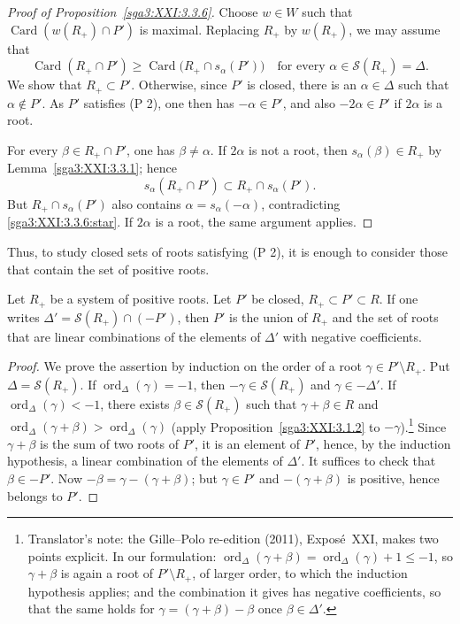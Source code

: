 \begin{proof}[Proof of Proposition~\ref{sga3:XXI:3.3.6}]
Choose \(w\in W\) such that
\(\operatorname{Card}(w(R_+)\cap P')\) is maximal. Replacing \(R_+\)
by \(w(R_+)\), we may assume that
\begin{equation}
 \operatorname{Card}(R_+\cap P')
 \geq
 \operatorname{Card}\bigl(R_+\cap s_\alpha(P')\bigr)
 \quad\text{for every }\alpha\in\mathscr{S}(R_+)=\Delta.
 \tag{\(\ast\)}\label{sga3:XXI:3.3.6:star}
\end{equation}
We show that \(R_+\subset P'\). Otherwise, since \(P'\) is closed,
there is an \(\alpha\in\Delta\) such that \(\alpha\notin P'\). As
\(P'\) satisfies (P 2), one then has \(-\alpha\in P'\), and also
\(-2\alpha\in P'\) if \(2\alpha\) is a root.

For every \(\beta\in R_+\cap P'\), one has \(\beta\neq\alpha\). If
\(2\alpha\) is not a root, then
\(s_\alpha(\beta)\in R_+\) by Lemma~\ref{sga3:XXI:3.3.1}; hence
\[
 s_\alpha(R_+\cap P')
 \subset R_+\cap s_\alpha(P').
\]
But \(R_+\cap s_\alpha(P')\) also contains
\(\alpha=s_\alpha(-\alpha)\), contradicting
\eqref{sga3:XXI:3.3.6:star}. If \(2\alpha\) is a root, the same
argument applies.
\end{proof}

Thus, to study closed sets of roots satisfying (P 2), it is enough to
consider those that contain the set of positive roots.

\begin{proposition}\label{sga3:XXI:3.3.10}
Let \(R_+\) be a system of positive roots. Let \(P'\) be closed,
\(R_+\subset P'\subset R\). If one writes
\(\Delta'=\mathscr{S}(R_+)\cap(-P')\), then \(P'\) is the union of
\(R_+\) and the set of roots that are linear combinations of the
elements of \(\Delta'\) with negative coefficients.
\end{proposition}

\begin{proof}
We prove the assertion by induction on the order of a root
\(\gamma\in P'\setminus R_+\). Put \(\Delta=\mathscr{S}(R_+)\). If
\(\operatorname{ord}_\Delta(\gamma)=-1\), then
\(-\gamma\in\mathscr{S}(R_+)\) and \(\gamma\in-\Delta'\). If
\(\operatorname{ord}_\Delta(\gamma)<-1\), there exists
\(\beta\in\mathscr{S}(R_+)\) such that \(\gamma+\beta\in R\) and
\(\operatorname{ord}_\Delta(\gamma+\beta)>\operatorname{ord}_\Delta(\gamma)\)
(apply Proposition~\ref{sga3:XXI:3.1.2} to \(-\gamma\)).\footnote{Translator's note: the Gille--Polo re-edition (2011), Exposé~XXI,
makes two points explicit. In our formulation:
\(\operatorname{ord}_\Delta(\gamma+\beta)=\operatorname{ord}_\Delta(\gamma)+1\leq-1\),
so \(\gamma+\beta\) is again a root of \(P'\setminus R_+\), of larger order, to which the
induction hypothesis applies; and the combination it gives has negative coefficients,
so that the same holds for \(\gamma=(\gamma+\beta)-\beta\) once \(\beta\in\Delta'\).}
Since
\(\gamma+\beta\) is the sum of two roots of \(P'\), it is an element of
\(P'\), hence, by the induction hypothesis, a linear combination of the
elements of \(\Delta'\). It suffices to check that \(\beta\in-P'\).
Now \(-\beta=\gamma-(\gamma+\beta)\); but \(\gamma\in P'\) and
\(-(\gamma+\beta)\) is positive, hence belongs to \(P'\).
\end{proof}


